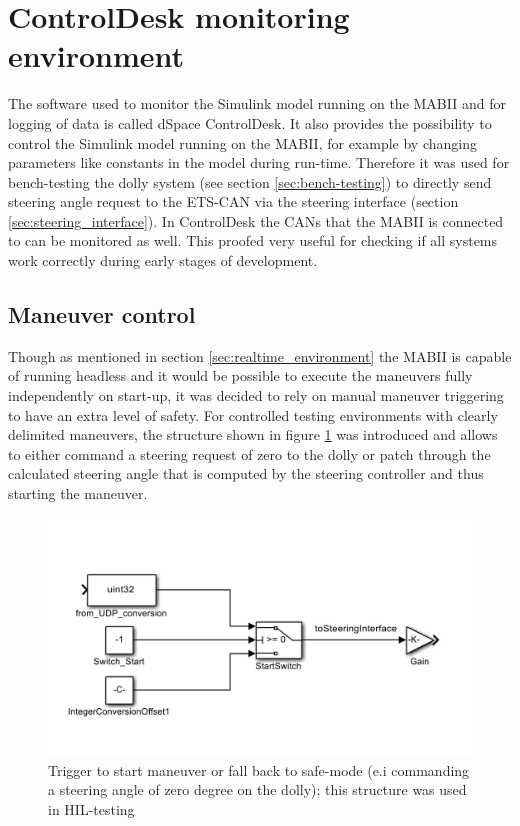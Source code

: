 \documentclass[ExampleMasters.tex]{subfiles}
\begin{document}
\section{ControlDesk monitoring environment}
\label{sec:control_desk}
The software used to monitor the Simulink model running on the \gls{MABII} and for logging of data is called dSpace ControlDesk. It also provides the possibility to control the Simulink model running on the MABII, for example by changing parameters like constants in the model during run-time. Therefore it was used for bench-testing the dolly system (see section \ref{sec:bench-testing}) to directly send steering angle request to the \gls{ETS}-\gls{CAN} via the steering interface (section \ref{sec:steering_interface}). In ControlDesk the \gls{CAN}s that the \gls{MABII} is connected to can be monitored as well. This proofed very useful for checking if all systems work correctly during early stages of development. 

\subsection{Maneuver control}
Though as mentioned in section \ref{sec:realtime_environment} the \gls{MABII} is capable of running headless and it would be possible to execute the maneuvers fully independently on start-up, it was decided to rely on manual maneuver triggering to have an extra level of safety. For controlled testing environments with clearly delimited maneuvers, the structure shown in figure \ref{fig:controlDesk_trigger} was introduced and allows to either command a steering request of zero to the dolly or patch through the calculated steering angle that is computed by the steering controller and thus starting the maneuver. 

\begin{figure}[!htb]
	\centering
	\includegraphics[width=0.6\linewidth]{figures/controlDesk_trigger}
	\caption{Trigger to start maneuver or fall back to safe-mode (e.i commanding a steering angle of zero degree on the dolly); this structure was used in \gls{HIL}-testing}
	\label{fig:controlDesk_trigger}
\end{figure}
\end{document}
